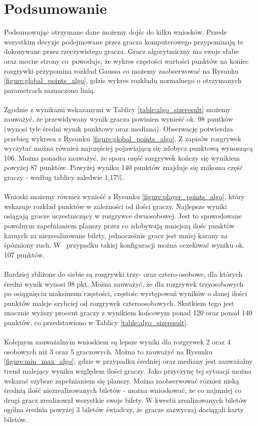 \documentclass[12pt, oneside]{report}
\begin{document}
\section{Podsumowanie} 
Podsumowując otrzymane dane możemy dojśc do kilku wniosków. Przede wszystkim decyzje podejmowane przez gracza komputerowego przypominają te dokonywane przez rzeczywistego gracza. Gracz algorytmiczny ma swoje słabe oraz mocne strony co~powoduje, że wykres częstości wartości punktów na koniec rozgrywki przypomina rozkład Gaussa co możemy zaobserwować na Rysunku \ref{figure:global_points_algo}, gdzie wykres rozkładu normalnego o otrzymanych parametrach zaznaczono linią. \\ \\
Zgodnie z wynikami wskazanymi w Tablicy \ref{table:algo_sizeresult} możemy zauważyć, że przewidywany wynik gracza powinien wynieść ok. 98 puntków (wynosi tyle średni wynik punktowy oraz mediana). Obserwację potwierdza przebieg wykresu z Rysunku \ref{figure:global_points_algo}. Z zapisów rozgrywek wyczytać można również najczęściej pojawiającą się zdobycz punktową wynoszącą 106. Można  ponadto zauważyć, że spora część rozgrywek kończy się wynikiem powyżej 87 punktów. Powyżej wyniku 140 punktów znajduje się znikoma część graczy - według tablicy zaledwie 1,17\%. \\ \\ 
Wnioski możemy również wynieść z Rysunku \ref{figure:player_points_algo}, który wskazuje rozkład punktów w zależności od ilości graczy. Najlepsze wyniki osiągają gracze uczestniczący w rozgrywce dwuosobowej. Jest to spowodowane powolnym zapełnianiem planszy przez co zdobywają mniejszą ilośc punktów karnych za niezrealizowane bilety, jednocześnie gracz jest mniej karany za śpózniony ruch. W~ przypadku takiej konfiguracji można oczekiwać wyniku ok. 107 punktów. \\ \\ 
Bardziej zbliżone do siebie są rozgrywki trzy- oraz cztero-osobowe, dla których średni wynik wynosi 98 pkt. Można zauważyć, że dla rozgrywek trzyosobowych po osiągnięciu maksimum częstości, częstośc występowań wyników o danej ilości punktów maleje szybciej od rozgrywek czteroosobowych. Skutkiem tego jest znacznie wyższy procent graczy z wynikiem końcowym ponad 120 oraz ponad 140 punktów, co przedstawiono w Tablicy \ref{table:algo_sizeresult}. \\ \\
Kolejnym zauważalnym wnioskiem są lepsze wyniki dla rozgrywek 2 oraz 4 osobowych niż 3 oraz 5 graczowych. Można to zauważyć na Rysunku \ref{figure:min_max_algo}, gdzie w przypadku średniej oraz mediany jest zauważalny trend malejący wyniku względem ilości graczy. Jako przyczynę tej sytuacji można wskazać szybsze zapełnianiem się planszy. Można zaobserwować róznież niską średnią ilość niezrealizowanych biletów - można wnioskować, że co najmniej co drugi gracz zrealizował wszystkie swoje bilety. W kwestii zrealizowanych biletów ogólna średnia powyżej 3 biletów świadczy, że gracze zazwyczaj dociągali karty biletów. \\ \\
\end{document}
